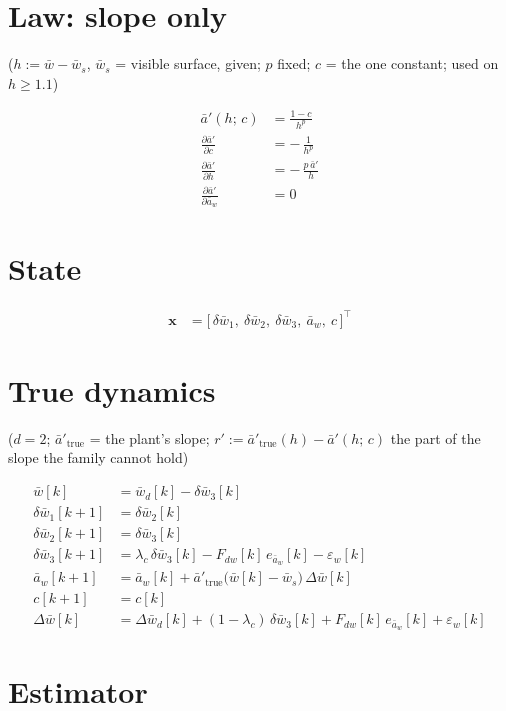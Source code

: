 \documentclass[11pt,a4paper,fontset=none]{ctexart}
\newcommand{\ba}{\bar{a}}
\newcommand{\bw}{\bar{w}}
\newcommand{\dW}{\Delta\bw}
\newcommand{\ap}{\ba'}
\begin{document}
\section{Law: slope only}

($h := \bw - \bw_s$, $\bw_s$ = visible surface, given; $p$ fixed; $c$ = the one constant; used on $h \ge 1.1$)

\begin{align*}
\ap(h;\,c)                        &= \frac{1 - c}{h^{p}} \\[2pt]
\frac{\partial\ap}{\partial c}    &= -\,\frac{1}{h^{p}} \\[2pt]
\frac{\partial\ap}{\partial h}    &= -\,\frac{p\,\ap}{h} \\[2pt]
\frac{\partial\ap}{\partial\ba_w} &= 0
\end{align*}

\section{State}

\begin{align*}
\mathbf{x} &= \bigl[\,\delta\bw_1,\ \delta\bw_2,\ \delta\bw_3,\ \ba_w,\ c\,\bigr]^{\top}
\end{align*}

\section{True dynamics}

($d = 2$; $\ap_{\mathrm{true}}$ = the plant's slope; $r' := \ap_{\mathrm{true}}(h) - \ap(h;\,c)$ the part of the slope the family cannot hold)

\begin{align*}
\bw[k]           &= \bw_d[k] - \delta\bw_3[k] \\
\delta\bw_1[k+1] &= \delta\bw_2[k] \\
\delta\bw_2[k+1] &= \delta\bw_3[k] \\
\delta\bw_3[k+1] &= \lambda_c\,\delta\bw_3[k] - F_{dw}[k]\,e_{\ba_w}[k] - \varepsilon_w[k] \\
\ba_w[k+1]       &= \ba_w[k] + \ap_{\mathrm{true}}\bigl(\bw[k]-\bw_s\bigr)\,\dW[k] \\
c[k+1]           &= c[k] \\[4pt]
\dW[k]           &= \Delta\bw_d[k] + (1-\lambda_c)\,\delta\bw_3[k] + F_{dw}[k]\,e_{\ba_w}[k] + \varepsilon_w[k]
\end{align*}

\section{Estimator}
\end{document}
